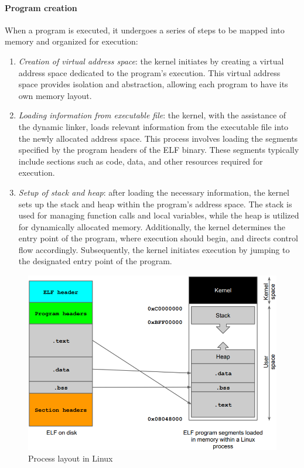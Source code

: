 \paragraph*{Program creation}
When a program is executed, it undergoes a series of steps to be mapped into memory and organized for execution:
\begin{enumerate}
    \item \textit{Creation of virtual address space}: the kernel initiates by creating a virtual address space dedicated to the program's execution.
        This virtual address space provides isolation and abstraction, allowing each program to have its own memory layout.
    \item \textit{Loading information from executable file}: the kernel, with the assistance of the dynamic linker, loads relevant information from the executable file into the newly allocated address space. 
        This process involves loading the segments specified by the program headers of the ELF binary. 
        These segments typically include sections such as code, data, and other resources required for execution.
    \item \textit{Setup of stack and heap}: after loading the necessary information, the kernel sets up the stack and heap within the program's address space. 
        The stack is used for managing function calls and local variables, while the heap is utilized for dynamically allocated memory. 
        Additionally, the kernel determines the entry point of the program, where execution should begin, and directs control flow accordingly.
        Subsequently, the kernel initiates execution by jumping to the designated entry point of the program.
\end{enumerate}
\begin{figure}[H]
    \centering
    \includegraphics[width=0.5\linewidth]{images/linux.png}
    \caption{Process layout in Linux}
\end{figure}

